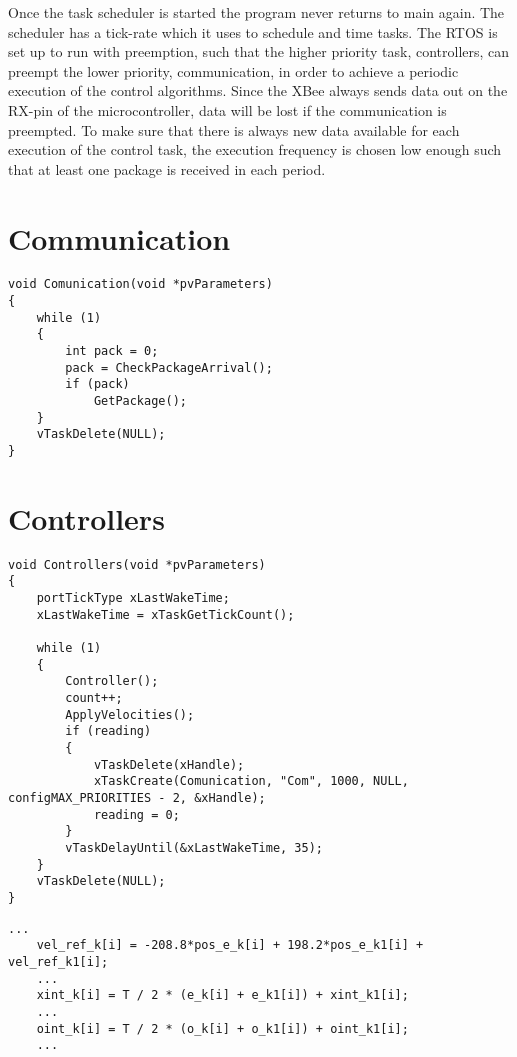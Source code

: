 Once the task scheduler is started the program never returns to main again. The scheduler has a tick-rate which it uses to schedule and time tasks. The RTOS is set up to run with preemption, such that the higher priority task, controllers, can preempt the lower priority, communication, in order to achieve a periodic execution of the control algorithms. Since the XBee always sends data out on the RX-pin of the microcontroller, data will be lost if the communication is preempted. To make sure that there is always new data available for each execution of the control task, the execution frequency is chosen low enough such that at least one package is received in each period.

\section{Communication}
\begin{lstlisting}[style=customcpp,
                caption={Code for the comunication task.}, 
                label=lst:scheduler]
void Comunication(void *pvParameters)
{
    while (1)
    {
        int pack = 0;
        pack = CheckPackageArrival();
        if (pack)
            GetPackage();
    }
    vTaskDelete(NULL);
}
\end{lstlisting}


\section{Controllers}
\begin{lstlisting}[style=customcpp,
caption={Code for the controller task.}, 
label=lst:scheduler]
void Controllers(void *pvParameters)
{
    portTickType xLastWakeTime;
    xLastWakeTime = xTaskGetTickCount();
    
    while (1)
    {
        Controller();
        count++;
        ApplyVelocities();
        if (reading)
        {
            vTaskDelete(xHandle);
            xTaskCreate(Comunication, "Com", 1000, NULL, configMAX_PRIORITIES - 2, &xHandle);
            reading = 0;
        }
        vTaskDelayUntil(&xLastWakeTime, 35);
    }
    vTaskDelete(NULL);
}
\end{lstlisting}


\begin{lstlisting}[style=customcpp,
caption={Code for the controllers.}, 
label=lst:scheduler]
    ...
    vel_ref_k[i] = -208.8*pos_e_k[i] + 198.2*pos_e_k1[i] + vel_ref_k1[i];
    ...
    xint_k[i] = T / 2 * (e_k[i] + e_k1[i]) + xint_k1[i];
    ...
    oint_k[i] = T / 2 * (o_k[i] + o_k1[i]) + oint_k1[i];
    ...

\end{lstlisting}